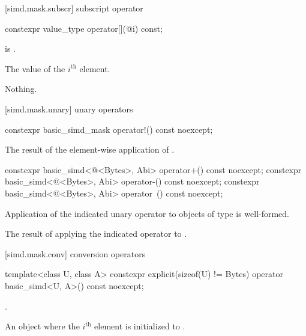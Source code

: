 [simd.mask.subscr]{ subscript operator}

\begin{itemdecl}
constexpr value_type operator[](@\simdsizetype@ i) const;
\end{itemdecl}

\begin{itemdescr}
  \pnum\expects
   is .

  \pnum\returns
  The value of the $i^\text{th}$ element.

  \pnum\throws Nothing.
\end{itemdescr}

[simd.mask.unary]{ unary operators}

\begin{itemdecl}
constexpr basic_simd_mask operator!() const noexcept;
\end{itemdecl}

\begin{itemdescr}
  \pnum\returns
  The result of the element-wise application of .
\end{itemdescr}

\begin{itemdecl}
constexpr basic_simd<@\integerfrom@<Bytes>, Abi> operator+() const noexcept;
constexpr basic_simd<@\integerfrom@<Bytes>, Abi> operator-() const noexcept;
constexpr basic_simd<@\integerfrom@<Bytes>, Abi> operator~() const noexcept;
\end{itemdecl}

\begin{itemdescr}
  \pnum\constraints
  Application of the indicated unary operator to objects of type  is well-formed.

  \pnum\returns
  The result of applying the indicated operator to .
\end{itemdescr}

[simd.mask.conv]{ conversion operators}

\begin{itemdecl}
template<class U, class A>
  constexpr explicit(sizeof(U) != Bytes) operator basic_simd<U, A>() const noexcept;
\end{itemdecl}

\begin{itemdescr}
  \pnum\constraints
  .

  \pnum\returns
  An object where the $i^\text{th}$ element is initialized to
  .
\end{itemdescr}

